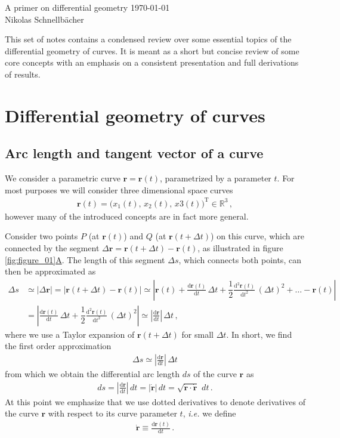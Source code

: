 \documentclass[11pt, DINA4, fleqn]{amsart}
\def\df{\mathrm{d}\xspace}
\newcommand{\dd}[2]{\frac{\df#1}{\df#2}}
\newcommand{\ddd}[2]{\frac{\df^2#1}{\df#2^2}}
\def\vr{\boldsymbol{r}\xspace}
\def\vrd{\dot{\vr}\xspace}
\begin{document}
\begin{flushleft}
{\sc \LARGE A primer on differential geometry} \hfill \today \\
\medskip
\Large
Nikolas Schnellbächer \underline{\hspace{6.53in}} \\
\end{flushleft}

This set of notes contains a condensed review over some  essential topics of the differential geometry of curves. It is meant as a short but concise review of some core concepts with an emphasis on a consistent presentation and full derivations of results.


\section{Differential geometry of curves}
\subsection{Arc length and tangent vector of a curve}

We consider a parametric curve $\vr = \vr(t)$, parametrized by a parameter $t$.
For most purposes we will consider three dimensional space curves
\begin{align}
\vr(t) = \bigl(x_1(t),\, x_2(t),\, x3(t)\bigl)^{\text{T}}\in \mathbb{R}^3 \, ,
\end{align}
however many of the introduced concepts are in fact more general.

Consider two points $P$ (at $\vr(t)$) and $Q$ (at $\vr(t+ \Delta t)$) on this curve, which are connected by the segment $\Delta\vr = \vr(t+\Delta t) - \vr(t)$, as illustrated in figure \ref{fig:figure_01}\hyperref[fig:figure_01]{A}. The length of this segment $\Delta s$, which connects both points, can then be approximated as
\begin{align}
\Delta s &\simeq |\Delta \vr| = 
\left| \vr(t + \Delta t) - \vr(t)
\right| \simeq
\left|
\vr(t) + \dd{\vr(t)}{t}\, \Delta t + \dfrac{1}{2}\ddd{\vr(t)}{t}\, (\Delta t)^2 + \dots
- \vr(t)
\right| \\
&= 
\left|
\dd{\vr(t)}{t}\, \Delta t + \dfrac{1}{2}\ddd{\vr(t)}{t}\, (\Delta t)^2
\right|
\simeq \left|\dd{\vr}{t}\right| \, \Delta t \, ,
\end{align}
where we use a Taylor expansion of $\vr(t+\Delta t)$ for small $\Delta t$. In short, we find the first order approximation
\begin{align}
\Delta s \simeq \left|\dd{\vr}{t}\right| \, \Delta t
\end{align}
from which we obtain the differential arc length $ds$ of the curve $\vr$ as
\begin{align}
ds = \left|\dd{\vr}{t}\right| \, dt
= \left|\vrd\right| \, dt = \sqrt{\vrd \cdot \vrd} \,\, dt \, .
\label{eq:diffArc}
\end{align}
At this point we emphasize
that we use dotted derivatives to denote derivatives of the curve $\vr$ with respect to its curve parameter $t$, \textit{i.e.} we define
\begin{align}
\vrd \equiv \dd{\vr(t)}{t} \, .
\end{align}
\end{document}
